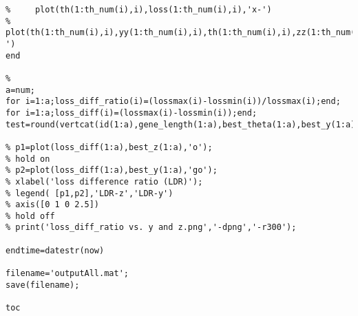 \documentclass{article}
\begin{document}
\begin{lstlisting}[frame=single]
%     plot(1:length(d0{i}),d0{i},'k',1:length(d0{i}),d1{i},'r');
%     plot(th(1:th_num(i),i),loss(1:th_num(i),i),'x-')
%     plot(th(1:th_num(i),i),yy(1:th_num(i),i),th(1:th_num(i),i),zz(1:th_num(i),i),'x-')
end

% 
a=num;
for i=1:a;loss_diff_ratio(i)=(lossmax(i)-lossmin(i))/lossmax(i);end;
for i=1:a;loss_diff(i)=(lossmax(i)-lossmin(i));end;
test=round(vertcat(id(1:a),gene_length(1:a),best_theta(1:a),best_y(1:a),best_z(1:a),loss_diff_ratio,loss_diff,lossmax(1:a),lossmin(1:a),lossavg(1:a))',2);

% p1=plot(loss_diff(1:a),best_z(1:a),'o');
% hold on
% p2=plot(loss_diff(1:a),best_y(1:a),'go');
% xlabel('loss difference ratio (LDR)');
% legend( [p1,p2],'LDR-z','LDR-y')
% axis([0 1 0 2.5])
% hold off
% print('loss_diff_ratio vs. y and z.png','-dpng','-r300');

endtime=datestr(now)

filename='outputAll.mat';
save(filename);

toc
\end{lstlisting}
\end{document}
